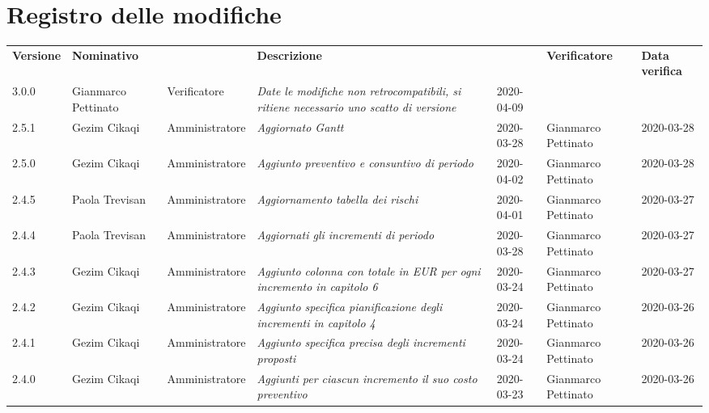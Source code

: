\section*{Registro delle modifiche}
\renewcommand{\arraystretch}{1.8}
  \setlength\LTleft{-1.7cm}
  \begin{longtable}{|p{1.7cm}|p{2cm}|p{2.5cm}|p{3cm}|p{1.7cm}|p{2cm}|p{2.3cm}|}
    \hline
    \rowcolor{header}
    \textbf{Versione} & \textbf{Nominativo} & \centering{\textbf{Ruolo}} & \textbf{Descrizione} &      \centering{\textbf{Data}} & \textbf{Verificatore} & \textbf{Data verifica} \\
    
    3.0.0 & Gianmarco Pettinato & Verificatore & \small{\textit{Date le modifiche non retrocompatibili, si ritiene necessario uno scatto di versione}} & 2020-04-09 & &\\
    2.5.1 & Gezim Cikaqi & Amministratore & \small{\textit{Aggiornato Gantt}} & 2020-03-28 & Gianmarco Pettinato & 2020-03-28\\
    2.5.0 & Gezim Cikaqi & Amministratore & \small{\textit{Aggiunto preventivo e consuntivo di periodo}} & 2020-04-02 & Gianmarco Pettinato & 2020-03-28\\
    2.4.5 & Paola Trevisan & Amministratore & \small{\textit{Aggiornamento tabella dei rischi}} & 2020-04-01 & Gianmarco Pettinato & 2020-03-27\\
    2.4.4 & Paola Trevisan & Amministratore & \small{\textit{Aggiornati gli incrementi di periodo}} & 2020-03-28 & Gianmarco Pettinato & 2020-03-27\\
    2.4.3 & Gezim Cikaqi & Amministratore & \small{\textit{Aggiunto colonna con totale in EUR per ogni incremento in capitolo 6}} & 2020-03-24 & Gianmarco Pettinato & 2020-03-27\\
    2.4.2 & Gezim Cikaqi & Amministratore & \small{\textit{Aggiunto specifica pianificazione degli incrementi in capitolo 4}} & 2020-03-24 & Gianmarco Pettinato & 2020-03-26\\
    2.4.1 & Gezim Cikaqi & Amministratore & \small{\textit{Aggiunto specifica precisa degli incrementi proposti}} & 2020-03-24 & Gianmarco Pettinato & 2020-03-26\\
    2.4.0 & Gezim Cikaqi & Amministratore & \small{\textit{Aggiunti per ciascun incremento il suo costo preventivo}} & 2020-03-23 & Gianmarco Pettinato & 2020-03-26\\

\end{longtable}
